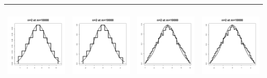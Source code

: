 \documentclass[10pt]{report}
\begin{document}
\begin{exercice}
\begin{enumerate}
\begin{tabular}{|c|c|c|c|}
\includegraphics[width=4cm,height=4cm]{img/n2MoyDes} & \includegraphics[width=4cm,height=4cm]{img/n2DeltaMoyDes} & \includegraphics[width=4cm,height=4cm]{img/n2MoyUnifs} & \includegraphics[width=4cm,height=4cm]{img/n2DeltaMoyUnifs}\\\hline

\end{tabular}
\end{enumerate}
\end{exercice}
\end{document}
